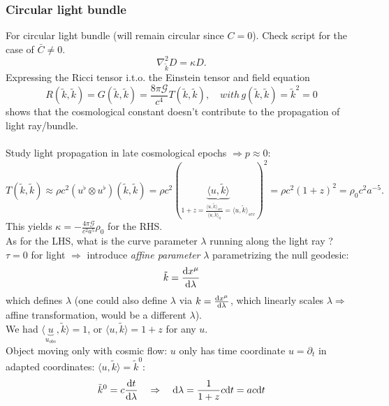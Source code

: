 \subsubsection{Circular light bundle}
For circular light bundle (will remain circular since $C=0$). Check script for the case of $\bar{C}\neq 0$.
\begin{equation}
\nabla^2_{\tilde{k}} D = \kappa D.
\end{equation}
Expressing the Ricci tensor i.t.o. the Einstein tensor and field equation
\begin{equation}
R(\tilde{k},\tilde{k}) = G(\tilde{k}, \tilde{k}) = \frac{8 \pi \mathcal{G}}{c^4} T(\tilde{k},\tilde{k}), \quad with\, g(\tilde{k},\tilde{k})=\tilde{k}^2=0
\end{equation}
shows that the cosmological constant doesn't contribute to the propagation of light ray/bundle.\\
\\
Study light propagation in late cosmological epochs $\Rightarrow p\approx 0$:
\begin{equation}
T(\tilde{k},\tilde{k}) \approx \rho c^2 (u^{\flat} \otimes u^{\flat})(\tilde{k},\tilde{k}) = \rho c^2 (\underbrace{\langle u,\tilde{k} \rangle}_{1+z=\frac{\langle u,\tilde{k}\rangle_{src}}{\langle u, \tilde{k}\rangle_0} = \langle u,\tilde{k}\rangle_{src}}  )^2 = \rho  c^2 (1+z)^2 = \rho_0 c^2 a^{-5}.
\end{equation}
This yields $\kappa = - \frac{4 \pi \mathcal{G}}{c^2 a^5} \rho_0$ for the RHS. \\
As for the LHS, what is the curve parameter $\lambda$ running along the light ray ? $\tau=0$ for light $\Rightarrow$ introduce \emph{affine parameter} $\lambda$ parametrizing the null geodesic:
\begin{equation}
\tilde{k} = \frac{\mathrm{d} x^{\mu}}{\mathrm{d} \lambda}
\end{equation}
which defines $\lambda$ (one could also define $\lambda$ via $k= \frac{\mathrm{d} x^{\mu}}{\mathrm{d} \lambda}$, which linearly scales $\lambda\Rightarrow$ affine transformation, would be a different $\lambda$). \\
We had $\langle \underbrace{u}_{u_{obs}},\tilde{k} \rangle = 1$, or $\langle u, \tilde{k} \rangle = 1+z$ for any $u$.\\
Object moving only with cosmic flow: $u$ only has time coordinate $u = \partial_t$ in adapted coordinates: $\langle u, \tilde{k} \rangle = \tilde{k}^0$:
\begin{equation}
\tilde{k}^0 = c \frac{\mathrm{d} t}{\mathrm{d} \lambda} \quad \Rightarrow \quad \mathrm{d} \lambda = \frac{1}{1+z} c \mathrm{d} t = a c \mathrm{d} t 
\end{equation}

